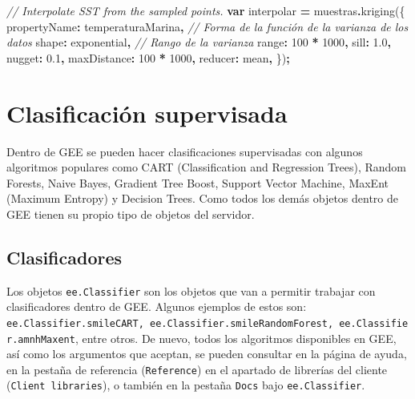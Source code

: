 \documentclass[
  12pt,
  letterpaper,
  twoside]{book}
\newenvironment{Shaded}{\begin{snugshade}}{\end{snugshade}}
\newcommand{\CommentTok}[1]{\textcolor[rgb]{0.56,0.35,0.01}{\textit{#1}}}
\newcommand{\DataTypeTok}[1]{\textcolor[rgb]{0.13,0.29,0.53}{#1}}
\newcommand{\DecValTok}[1]{\textcolor[rgb]{0.00,0.00,0.81}{#1}}
\newcommand{\FloatTok}[1]{\textcolor[rgb]{0.00,0.00,0.81}{#1}}
\newcommand{\FunctionTok}[1]{\textcolor[rgb]{0.00,0.00,0.00}{#1}}
\newcommand{\KeywordTok}[1]{\textcolor[rgb]{0.13,0.29,0.53}{\textbf{#1}}}
\newcommand{\NormalTok}[1]{#1}
\newcommand{\OperatorTok}[1]{\textcolor[rgb]{0.81,0.36,0.00}{\textbf{#1}}}
\newcommand{\StringTok}[1]{\textcolor[rgb]{0.31,0.60,0.02}{#1}}
\begin{document}
\begin{Shaded}
\begin{Highlighting}[]
\CommentTok{// Interpolate SST from the sampled points.}
\KeywordTok{var}\NormalTok{ interpolar }\OperatorTok{=}\NormalTok{ muestras}\OperatorTok{.}\FunctionTok{kriging}\NormalTok{(\{}
  \DataTypeTok{propertyName}\OperatorTok{:} \StringTok{\textquotesingle{}temperaturaMarina\textquotesingle{}}\OperatorTok{,}
  \CommentTok{// Forma de la función de la varianza de los datos}
  \DataTypeTok{shape}\OperatorTok{:} \StringTok{\textquotesingle{}exponential\textquotesingle{}}\OperatorTok{,} 
  \CommentTok{// Rango de la varianza}
  \DataTypeTok{range}\OperatorTok{:} \DecValTok{100} \OperatorTok{*} \DecValTok{1000}\OperatorTok{,} 
  \DataTypeTok{sill}\OperatorTok{:} \FloatTok{1.0}\OperatorTok{,}
  \DataTypeTok{nugget}\OperatorTok{:} \FloatTok{0.1}\OperatorTok{,}
  \DataTypeTok{maxDistance}\OperatorTok{:} \DecValTok{100} \OperatorTok{*} \DecValTok{1000}\OperatorTok{,}
  \DataTypeTok{reducer}\OperatorTok{:} \StringTok{\textquotesingle{}mean\textquotesingle{}}\OperatorTok{,}
\NormalTok{\})}\OperatorTok{;}
\end{Highlighting}
\end{Shaded}

\newpage

\hypertarget{clasificaciuxf3n-supervisada}{%
\chapter{Clasificación supervisada}\label{clasificaciuxf3n-supervisada}}

Dentro de GEE se pueden hacer clasificaciones supervisadas con algunos algoritmos populares como CART (Classification and Regression Trees), Random Forests, Naive Bayes, Gradient Tree Boost, Support Vector Machine, MaxEnt (Maximum Entropy) y Decision Trees. Como todos los demás objetos dentro de GEE tienen su propio tipo de objetos del servidor.

\hypertarget{clasificadores}{%
\section{Clasificadores}\label{clasificadores}}

Los objetos \texttt{ee.Classifier} son los objetos que van a permitir trabajar con clasificadores dentro de GEE. Algunos ejemplos de estos son: \texttt{ee.Classifier.smileCART,\ ee.Classifier.smileRandomForest,\ ee.Classifier.amnhMaxent}, entre otros. De nuevo, todos los algoritmos disponibles en GEE, así como los argumentos que aceptan, se pueden consultar en la página de ayuda, en la pestaña de referencia (\texttt{Reference}) en el apartado de librerías del cliente (\texttt{Client\ libraries}), o también en la pestaña \texttt{Docs} bajo \texttt{ee.Classifier}.
\end{document}
